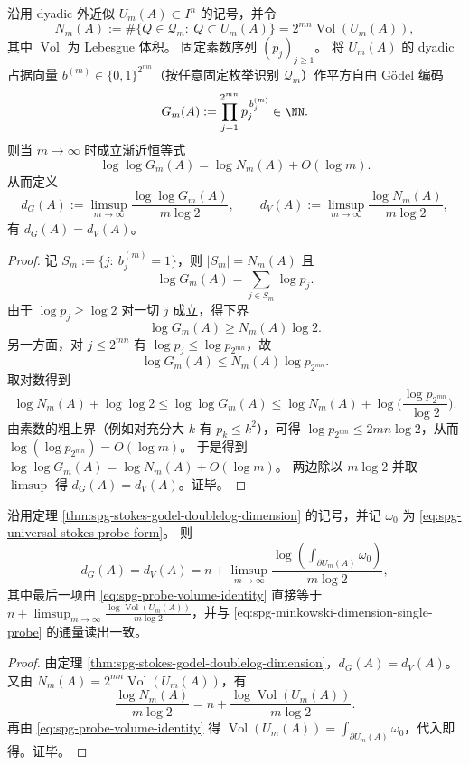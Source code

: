 \begin{theorem}\label{thm:spg-stokes-godel-doublelog-dimension}
沿用 dyadic 外近似 \(U_m(A)\subset I^n\) 的记号，并令
\[
N_m(A):=\#\{Q\in\mathcal Q_m:\ Q\subset U_m(A)\}
=2^{mn}\operatorname{Vol}(U_m(A)),
\]
其中 \(\operatorname{Vol}\) 为 Lebesgue 体积。
固定素数序列 \((p_j)_{j\ge 1}\)。
将 \(U_m(A)\) 的 dyadic 占据向量 \(b^{(m)}\in\{0,1\}^{2^{mn}}\)（按任意固定枚举识别 \(\mathcal Q_m\)）作平方自由 Gödel 编码
\[
G_m(A):=\prod_{j=1}^{2^{mn}} p_j^{\,b^{(m)}_j}\in\NN.
\]
则当 \(m\to\infty\) 时成立渐近恒等式
\[
\log\log G_m(A)=\log N_m(A)+O(\log m).
\]
从而定义
\[
d_G(A):=\limsup_{m\to\infty}\frac{\log\log G_m(A)}{m\log 2},
\qquad
d_V(A):=\limsup_{m\to\infty}\frac{\log N_m(A)}{m\log 2},
\]
有 \(d_G(A)=d_V(A)\)。
\end{theorem}
\begin{proof}
记 \(S_m:=\{j:\ b^{(m)}_j=1\}\)，则 \(|S_m|=N_m(A)\) 且
\[
\log G_m(A)=\sum_{j\in S_m}\log p_j.
\]
由于 \(\log p_j\ge \log 2\) 对一切 \(j\) 成立，得下界
\[
\log G_m(A)\ge N_m(A)\log 2.
\]
另一方面，对 \(j\le 2^{mn}\) 有 \(\log p_j\le \log p_{2^{mn}}\)，故
\[
\log G_m(A)\le N_m(A)\log p_{2^{mn}}.
\]
取对数得到
\[
\log N_m(A)+\log\log 2
\le
\log\log G_m(A)
\le
\log N_m(A)+\log\!\Big(\frac{\log p_{2^{mn}}}{\log 2}\Big).
\]
由素数的粗上界（例如对充分大 \(k\) 有 \(p_k\le k^2\)），可得
\(
\log p_{2^{mn}}\le 2mn\log 2
\)，从而 \(\log(\log p_{2^{mn}})=O(\log m)\)。
于是得到
\(
\log\log G_m(A)=\log N_m(A)+O(\log m)
\)。
两边除以 \(m\log 2\) 并取 \(\limsup\) 得 \(d_G(A)=d_V(A)\)。证毕。
\end{proof}



\begin{corollary}\label{cor:spg-stokes-godel-dimension-chain}
沿用定理 \ref{thm:spg-stokes-godel-doublelog-dimension} 的记号，并记 \(\omega_0\) 为 \eqref{eq:spg-universal-stokes-probe-form}。
则
\[
d_G(A)=d_V(A)=n+\limsup_{m\to\infty}\frac{\log\!\left(\int_{\partial U_m(A)}\omega_0\right)}{m\log 2},
\]
其中最后一项由 \eqref{eq:spg-probe-volume-identity} 直接等于
\(
n+\limsup_{m\to\infty}\frac{\log\operatorname{Vol}(U_m(A))}{m\log 2}
\)，并与 \eqref{eq:spg-minkowski-dimension-single-probe} 的通量读出一致。
\end{corollary}
\begin{proof}
由定理 \ref{thm:spg-stokes-godel-doublelog-dimension}，\(d_G(A)=d_V(A)\)。
又由 \(N_m(A)=2^{mn}\operatorname{Vol}(U_m(A))\)，有
\[
\frac{\log N_m(A)}{m\log 2}
=n+\frac{\log\operatorname{Vol}(U_m(A))}{m\log 2}.
\]
再由 \eqref{eq:spg-probe-volume-identity} 得 \(\operatorname{Vol}(U_m(A))=\int_{\partial U_m(A)}\omega_0\)，代入即得。证毕。
\end{proof}

